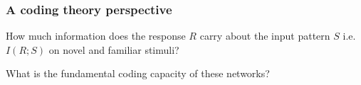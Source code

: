 \documentclass{beamer}
\begin{document}
\begin{frame}[plain]
\frametitle{A coding theory perspective} 

How much information does the response $R$ carry about the input pattern $S$ i.e. $I(R;S)$ on novel and familiar stimuli?

\vspace{0.2in}

What is the fundamental coding capacity of these networks?

\end{frame}


\begin{thebibliography}{99} 
\end{thebibliography}
\end{document}
